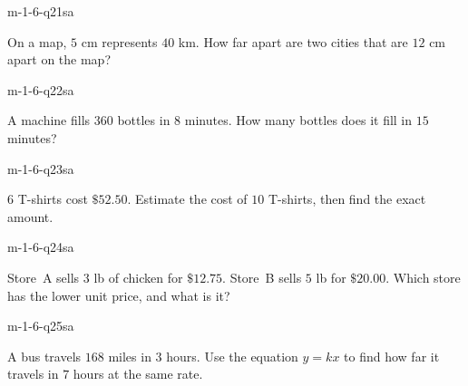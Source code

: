 \begin{practiceQuestion}{m-1-6-q21}{sa}
\begin{questionText}
On a map, $5$ cm represents $40$ km. How far apart are two cities that are $12$ cm apart on the map?
\end{questionText}
\end{practiceQuestion}

\begin{practiceQuestion}{m-1-6-q22}{sa}
\begin{questionText}
A machine fills $360$ bottles in $8$ minutes. How many bottles does it fill in $15$ minutes?
\end{questionText}
\end{practiceQuestion}

\begin{practiceQuestion}{m-1-6-q23}{sa}
\begin{questionText}
$6$ T-shirts cost $\$52.50$. Estimate the cost of $10$ T-shirts, then find the exact amount.
\end{questionText}
\end{practiceQuestion}

\begin{practiceQuestion}{m-1-6-q24}{sa}
\begin{questionText}
Store~A sells $3$ lb of chicken for $\$12.75$. Store~B sells $5$ lb for $\$20.00$. Which store has the lower unit price, and what is it?
\end{questionText}
\end{practiceQuestion}

\begin{practiceQuestion}{m-1-6-q25}{sa}
\begin{questionText}
A bus travels $168$ miles in $3$ hours. Use the equation $y = kx$ to find how far it travels in $7$ hours at the same rate.
\end{questionText}
\end{practiceQuestion}

